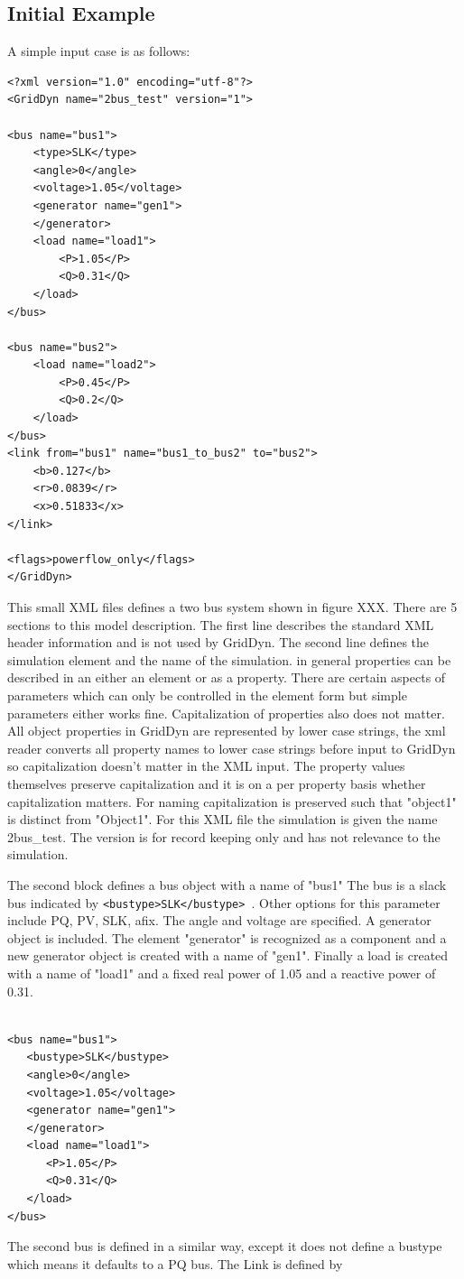 \documentclass[12pt]{article} %
\begin{document}
\subsection{Initial Example}
A simple input case is as follows:
\begin{lstlisting}
<?xml version="1.0" encoding="utf-8"?>
<GridDyn name="2bus_test" version="1">

<bus name="bus1">
    <type>SLK</type>
    <angle>0</angle>
    <voltage>1.05</voltage>
    <generator name="gen1">
    </generator>
    <load name="load1">
        <P>1.05</P>
        <Q>0.31</Q>
    </load>
</bus>

<bus name="bus2">
    <load name="load2">
        <P>0.45</P>
        <Q>0.2</Q>
    </load>
</bus>
<link from="bus1" name="bus1_to_bus2" to="bus2">
    <b>0.127</b>
    <r>0.0839</r>
    <x>0.51833</x>
</link>

<flags>powerflow_only</flags>
</GridDyn>
\end{lstlisting}

This small XML files defines a two bus system shown in figure XXX.  
There are 5 sections to this model description.  The first line describes the standard XML header information and is not used by GridDyn.  The second line defines the simulation element and the name of the simulation.  in general properties can be described in an either an element or as a property.  There are certain aspects of parameters which can only be controlled in the element form but simple parameters either works fine.  Capitalization of properties also does not matter.  All object properties in GridDyn are represented by lower case strings,  the xml reader converts all property names to lower case strings before input to GridDyn so capitalization doesn't matter in the XML input.  The property values themselves preserve capitalization and it is on a per property basis whether capitalization matters.  For naming capitalization is preserved such that "object1"  is distinct from "Object1".   For this XML file the simulation is given the name 2bus\_test.  The version is for record keeping only and has not relevance to the simulation.  

The second block defines a bus object with a name of "bus1"  The bus is a slack bus indicated by {\tt <bustype>SLK</bustype> }.  Other options for this parameter include PQ, PV, SLK, afix.    The angle and voltage are specified.  A generator object is included.  The element "generator" is recognized as a component and a new generator object is created with a name of "gen1".  Finally a load is created with a name of "load1" and a fixed real power of 1.05 and a reactive power of 0.31.  
\begin{lstlisting}

<bus name="bus1">
   <bustype>SLK</bustype>
   <angle>0</angle>
   <voltage>1.05</voltage>
   <generator name="gen1">
   </generator>
   <load name="load1">
      <P>1.05</P>
      <Q>0.31</Q>
   </load>
</bus>

\end{lstlisting}
The second bus is defined in a similar way, except it does not define a bustype which means it defaults to a PQ bus.  
The Link is defined by
\end{document}
